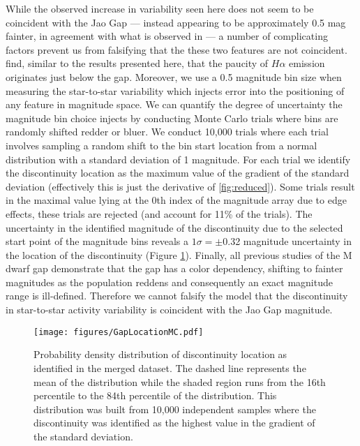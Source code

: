 While the observed increase in variability seen here does not seem to be
coincident with the Jao Gap --- instead appearing to be approximately 0.5 mag
fainter, in agreement with what is observed in \citet{Jao2023} --- a number of
complicating factors prevent us from falsifying that the these two features are
not coincident. \citeauthor{Jao2023} find, similar to the results presented
here, that the paucity of $H\alpha$ emission originates just below the gap.
Moreover, we use a 0.5 magnitude bin size when measuring the star-to-star
variability which injects error into the positioning of any feature in
magnitude space. We can quantify the degree of uncertainty the magnitude bin
choice injects by conducting Monte Carlo trials where bins are randomly shifted
redder or bluer. We conduct 10,000 trials where each trial involves sampling a
random shift to the bin start location from a normal distribution with a
standard deviation of 1 magnitude. For each trial we identify the discontinuity
location as the maximum value of the gradient of the standard deviation
(effectively this is just the derivative of \ref{fig:reduced}). Some trials
result in the maximal value lying at the 0th index of the magnitude array due
to edge effects, these trials are rejected (and account for 11\% of the
trials). The uncertainty in the identified magnitude of the discontinuity due
to the selected start point of the magnitude bins reveals a $1\sigma = \pm$0.32
magnitude uncertainty in the location of the discontinuity (Figure
\ref{fig:GapLocationMC}). Finally, all previous studies of the M dwarf gap
\citep{Jao2018, Feiden2022, Mansfield2021, Boudreaux2022, Jao2023} demonstrate
that the gap has a color dependency, shifting to fainter magnitudes as the
population reddens and consequently an exact magnitude range is ill-defined.
Therefore we cannot falsify the model that the discontinuity in star-to-star activity
variability is coincident with the Jao Gap magnitude.

\begin{figure}
  \centering
  \texttt{[image: figures/GapLocationMC.pdf]}
  \caption{Probability density distribution of discontinuity location as
  identified in the merged dataset. The dashed line represents the mean of the
  distribution while the shaded region runs from the 16th percentile to the
  84th percentile of the distribution. This distribution was built from 10,000
  independent samples where the discontinuity was identified as the highest
  value in the gradient of the standard deviation.}
  \label{fig:GapLocationMC}
\end{figure}

